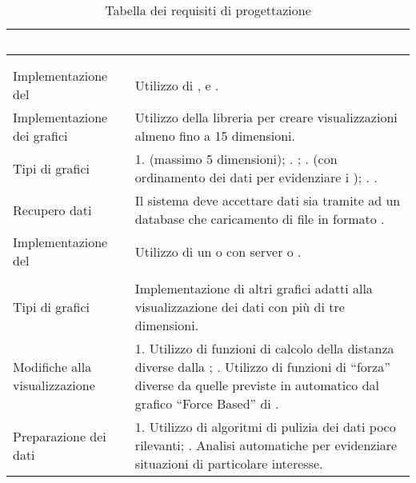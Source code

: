 \renewcommand{\arraystretch}{1.5}
\begin{longtable}{C{4cm} | C{11.5cm}}
		\textcolor{white}{\textbf{Tipologia}} & 
		\textcolor{white}{\textbf{Descrizione}} \\
		\endfirsthead
	    \\
	    \endfoot
	    \caption{Tabella dei requisiti di progettazione}
	    \endlastfoot

\\	    
	    
Implementazione del  & Utilizzo di ,  e . \\

Implementazione dei grafici & Utilizzo della libreria  per creare visualizzazioni almeno fino a 15 dimensioni. \\

Tipi di grafici & 
1.  (massimo 5 dimensioni);
.   ;
.  (con ordinamento dei dati per evidenziare i );
. .
\\

Recupero dati & Il sistema deve accettare dati sia tramite  ad un database che caricamento di file in formato . \\

Implementazione del  & Utilizzo di un   o  con server  o . \\
	    
\\	

Tipi di grafici & Implementazione di altri grafici adatti alla visualizzazione dei dati con più di tre dimensioni. \\

Modifiche alla visualizzazione & 1. Utilizzo di funzioni di calcolo della distanza diverse dalla ; . Utilizzo di funzioni di “forza” diverse da quelle previste in automatico dal grafico “Force Based” di . \\

Preparazione dei dati & 1. Utilizzo di algoritmi di pulizia dei dati poco rilevanti; . Analisi automatiche per evidenziare situazioni di particolare interesse. \\

\end{longtable}



